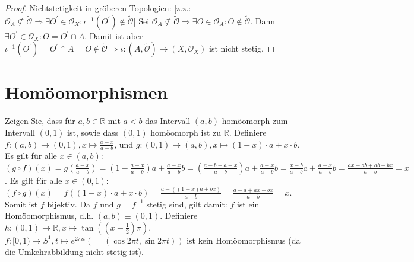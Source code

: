 \documentclass[a4paper,11pt,notitlepage]{report}
\newcommand{\R}{{\ensuremath{\mathbb{R}}}}
\newcommand{\OO}{{\ensuremath{\mathcal{O}}}}
\begin{document}
\begin{proof}
\underline{Nichtstetigkeit in gröberen Topologien}: [\underline{z.z.}: $\OO_A \not\subseteq \tilde \OO \Rightarrow \exists O^\prime \in \OO_X \colon \iota^{-1}(O^\prime) \notin \tilde \OO$]
\newline
Sei $\OO_A \not\subseteq \tilde \OO \Rightarrow \exists O \in \OO_A\colon O \notin \tilde\OO$. Dann  $\exists O^\prime \in \OO_X \colon O = O^\prime \cap A$. Damit ist aber $\iota^{-1}(O^\prime)=O^\prime \cap A = O \notin \tilde\OO \Rightarrow \iota\colon (A,\tilde\OO) \rightarrow (X,\OO_X)$ ist nicht stetig.
\end{proof}

\section{Homöomorphismen}
Zeigen Sie, dass für $a,b \in \R$ mit $a < b$ das Intervall $(a,b)$ homöomorph zum Intervall $(0,1)$ ist, sowie dass $(0,1)$ homöomorph ist zu $\R$.
\newline
Definiere $f \colon (a,b) \rightarrow (0,1), x \mapsto \frac{a-x}{a-b}$, und $g \colon (0,1) \rightarrow (a,b), x \mapsto (1-x) \cdot a + x \cdot b$.
\newline
Es gilt für alle $x \in (a,b)$:
\newline
$(g \circ f)(x) = g \left(\frac{a-x}{a-b}\right) = \left(1- \frac{a-x}{a-b}\right)a + \frac{a-x}{a-b}b = \left(\frac{a-b-a+x}{a-b}\right)a+ \frac{a-x}{a-b}b = \frac{x-b}{a-b}a + \frac{a-x}{a-b}b = \frac{ax-ab+ab-bx}{a-b} = x$.
\newline
Es gilt für alle $x \in (0,1)$:
\newline
$(f \circ g)(x)=f\left((1-x) \cdot a + x \cdot b\right)=\frac{a-((1-x)a+bx)}{a-b}=\frac{a-a+ax-bx}{a-b}=x$. Somit ist $f$ bijektiv. 
Da $f$ und $g = f^{-1}$ stetig sind, gilt damit: $f$ ist ein Homöomorphismus, d.h. $(a,b) \equiv (0,1)$.
\newline
Definiere $h \colon (0,1) \rightarrow \R, x \mapsto \tan{\left((x-\frac{1}{2})\pi \right)}$.
\newline
\newline
$f \colon [0,1) \rightarrow S^1, t \mapsto e^{2\pi i t} \left(=(\cos{2 \pi t}, \sin{2 \pi t})\right)$ ist kein Homöomorphismus (da die Umkehrabbildung nicht stetig ist).
\end{document}
